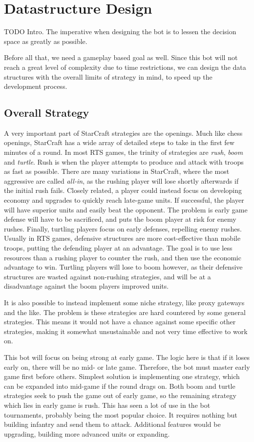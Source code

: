 \chapter{Datastructure Design}
TODO Intro. The imperative when designing the bot is to lessen the decision space as greatly as possible.

Before all that, we need a gameplay based goal as well. Since this bot will not reach a great level of complexity due to time restrictions, we can design the data structures with the overall limits of strategy in mind, to speed up the development process.

\section{Overall Strategy}
A very important part of StarCraft strategies are the openings. Much like chess openings, StarCraft has a wide array of detailed steps to take in the first few minutes of a round. In most RTS games, the trinity of strategies are \emph{rush}, \emph{boom} and \emph{turtle}. Rush is when the player attempts to produce and attack with troops as fast as possible. There are many variations in StarCraft, where the most aggressive are called \emph{all-in}, as the rushing player will lose shortly afterwards if the initial rush fails. Closely related, a player could instead focus on developing economy and upgrades to quickly reach late-game units. If successful, the player will have superior units and easily beat the opponent. The problem is early game defense will have to be sacrificed, and puts the boom player at risk for enemy rushes. Finally, turtling players focus on early defenses, repelling enemy rushes. Usually in RTS games, defensive structures are more cost-effective than mobile troops, putting the defending player at an advantage. The goal is to use less resources than a rushing player to counter the rush, and then use the economic advantage to win. Turtling players will lose to boom however, as their defensive structures are wasted against non-rushing strategies, and will be at a disadvantage against the boom players improved units.

It is also possible to instead implement some niche strategy, like proxy gateways and the like. The problem is these strategies are hard countered by some general strategies. This means it would not have a chance against some specific other strategies, making it somewhat unsustainable and not very time effective to work on.

This bot will focus on being strong at early game. The logic here is that if it loses early on, there will be no mid- or late game. Therefore, the bot must master early game first before others. Simplest solution is implementing one strategy, which can be expanded into mid-game if the round drags on. Both boom and turtle strategies seek to push the game out of early game, so the remaining strategy which lies in early game is rush. This has seen a lot of use in the bot tournaments, probably being the most popular choice. It requires nothing but building infantry and send them to attack. Additional features would be upgrading, building more advanced units or expanding.

